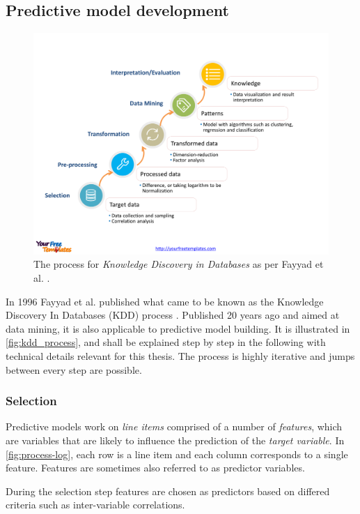 \subsection{Predictive model development}
\begin{figure}
	\centering
	\includegraphics[width=\textwidth]{gfx/kdd_process}
	\caption{The process for \textit{Knowledge Discovery in Databases} as per Fayyad et al. \cite{fayyad1996data}.}
	\label{fig:kdd_process}
\end{figure}

In 1996 Fayyad et al. published what came to be known as the Knowledge Discovery In Databases (KDD) process \cite{fayyad1996data}. Published 20 years ago and aimed at data mining, it is also applicable to predictive model building. It is illustrated in \autoref{fig:kdd_process}, and shall be explained step by step in the following with technical details relevant for this thesis. The process is highly iterative and jumps between every step are possible.

\subsubsection{Selection}
Predictive models work on \textit{line items} comprised of a number of \textit{features}, which are variables that are likely to influence the prediction of the \textit{target variable}. In \autoref{fig:process-log}, each row is a line item and each column corresponds to a single feature. Features are sometimes also referred to as predictor variables.

During the selection step features are chosen as predictors based on differed criteria such as inter-variable correlations.

